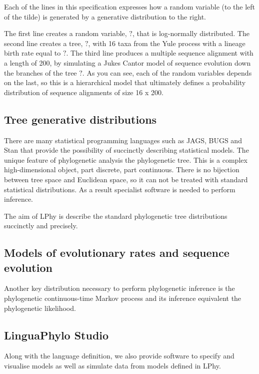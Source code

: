 \documentclass[11pt]{article}
\begin{document}
Each of the lines in this specification expresses how a random variable (to the left of the tilde) is generated by a generative distribution to the right.

The first line creates a random variable, $?$, that is log-normally distributed. The second line creates a tree, $?$, with 16 taxa from the Yule process with a lineage birth rate equal to $?$. The third line produces a multiple sequence alignment with a length of 200, by simulating a Jukes Cantor model of sequence evolution down the branches of the tree $?$. As you can see, each of the random variables depends on the last, so this is a hierarchical model that ultimately defines a probability distribution of sequence alignments of size 16 x 200.

\subsection{Tree generative distributions}

There are many statistical programming languages such as JAGS, BUGS and Stan that provide the possibility of succinctly describing statistical models. The unique feature of phylogenetic analysis the phylogenetic tree. This is a complex high-dimensional object, part discrete, part continuous. There is no bijection between tree space and Euclidean space, so it can not be treated with standard statistical distributions. As a result specialist software is needed to perform inference.

The aim of LPhy is describe the standard phylogenetic tree distributions succinctly and precisely. 

\subsection{Models of evolutionary rates and sequence evolution}

Another key distribution necessary to perform phylogenetic inference is the phylogenetic continuous-time Markov process and its inference equivalent the phylogenetic likelihood. 




\subsection{LinguaPhylo Studio}

Along with the language definition, we also provide software to specify and visualise models as well as simulate data from models defined in LPhy. 
\end{document}
